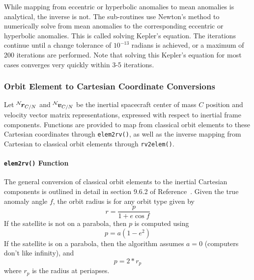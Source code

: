 While mapping from eccentric or hyperbolic anomalies to mean anomalies is analytical, the inverse is not.  The sub-routines use Newton's method to numerically solve from mean anomalies to the corresponding eccentric or hyperbolic anomalies.  This is called solving Kepler's equation.  The iterations continue until a change tolerance of $10^{-13}$ radians is achieved, or a maximum of 200 iterations are performed.  Note that solving this Kepler's equation for most cases converges very quickly within 3-5 iterations.  




\subsubsection{Orbit Element to Cartesian Coordinate Conversions}
Let $\leftexp{N}{\bm r}_{C/N}$ and $\leftexp{N}{\bm v}_{C/N}$ be the inertial spacecraft center of mass $C$ position and velocity vector matrix representations, expressed with respect to inertial frame  components.  Functions are provided to map from classical orbit elements to these Cartesian coordinates through {\tt elem2rv()}, as well as the inverse mapping from Cartesian to classical orbit elements through {\tt rv2elem()}.  

\paragraph{{\tt elem2rv()} Function}
The general conversion of classical orbit elements to the inertial Cartesian components is outlined in detail in section 9.6.2 of Reference~.  Given the true anomaly angle $f$, the orbit radius is for any orbit type given by
\begin{equation}
	r = \frac{p}{1 + e \cos f}
\end{equation}
If the satellite is not on a parabola, then $p$ is computed using
\begin{equation}
	p = a(1-e^{2})
\end{equation}
If the satellite is on a parabola, then the algorithm assumes $a=0$ (computers don't like infinity), and 
\begin{equation}
	p = 2*r_{p}
\end{equation}
where $r_{p}$ is the radius at periapses.

